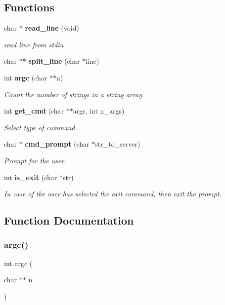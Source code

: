 \subsection*{Functions}
\begin{DoxyCompactItemize}
\item 
char $\ast$ \textbf{ read\+\_\+line} (void)
\begin{DoxyCompactList}\small\item\em read line from stdin \end{DoxyCompactList}\item 
char $\ast$$\ast$ \textbf{ split\+\_\+line} (char $\ast$line)
\item 
int \textbf{ argc} (char $\ast$$\ast$n)
\begin{DoxyCompactList}\small\item\em Count the number of strings in a string array. \end{DoxyCompactList}\item 
int \textbf{ get\+\_\+cmd} (char $\ast$$\ast$args, int n\+\_\+args)
\begin{DoxyCompactList}\small\item\em Select type of command. \end{DoxyCompactList}\item 
char $\ast$ \textbf{ cmd\+\_\+prompt} (char $\ast$str\+\_\+to\+\_\+server)
\begin{DoxyCompactList}\small\item\em Prompt for the user. \end{DoxyCompactList}\item 
int \textbf{ is\+\_\+exit} (char $\ast$str)
\begin{DoxyCompactList}\small\item\em In case of the user has selected the exit command, then exit the prompt. \end{DoxyCompactList}\end{DoxyCompactItemize}


\subsection{Function Documentation}
\mbox{\label{prompt_8c_a29367ea7e75861b6b3db15e6d3a030ce}} 
\subsubsection{argc()}
{\footnotesize\ttfamily int argc (\begin{DoxyParamCaption}\item[{char $\ast$$\ast$}]{n }\end{DoxyParamCaption})}



